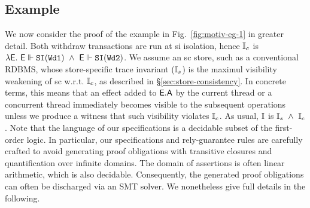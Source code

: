 \subsection{Example}

We now consider the proof of the example in Fig.~\ref{fig:motiv-eg-1}
in greater detail. Both withdraw transactions are run at {\sc si}
isolation, hence $\mathbb{I}_c$ is $\lambda\textsf{E}.~\textsf{E} \Vdash {\tt SI(Wd1)} ~\wedge~
\textsf{E} \Vdash {\tt SI(Wd2)}$. We assume an {\sc sc} store, such as a
conventional RDBMS, whose store-specific trace invariant ($\mathbb{I}_s$) is
the maximul visibility weakening of {\sc sc} w.r.t. $\mathbb{I}_c$, as
described in \S\ref{sec:store-consistency}. In concrete terms, this
means that an effect added to $\textsf{E}.\textsf{A}$ by the current thread or a
concurrent thread immediately becomes visible to the subsequent
operations unless we produce a witness that such visibility violates
$\mathbb{I}_c$. As usual, $\mathbb{I}$ is $\mathbb{I}_s ~\wedge~ \mathbb{I}_c$. Note that the language of
our specifications is a decidable subset of the first-order logic. In
particular, our specifications and rely-guarantee rules are carefully
crafted to avoid generating proof obligations with transitive closures
and quantification over infinite domains. The domain of assertions is
often linear arithmetic, which is also decidable. Consequently, the
generated proof obligations can often be discharged via an SMT solver.
We nonetheless give full details in the following.

